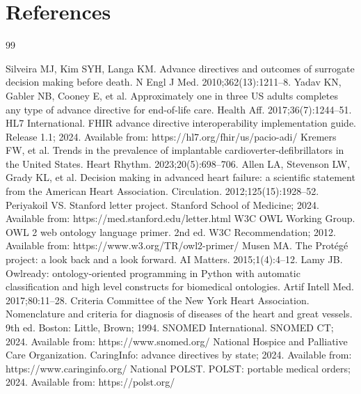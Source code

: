 \documentclass[10pt]{article}
\begin{document}
\section{References}
\begingroup
\renewcommand{\section}[2]{} %
\makeatletter\renewcommand{\@biblabel}[1]{#1.}\makeatother %
\begin{thebibliography}{99}
\small
\setlength{\itemsep}{0pt}
\setlength{\labelsep}{0.4em}

 Silveira MJ, Kim SYH, Langa KM. Advance directives and outcomes of surrogate decision making before death. N Engl J Med. 2010;362(13):1211--8.
 Yadav KN, Gabler NB, Cooney E, et al. Approximately one in three US adults completes any type of advance directive for end-of-life care. Health Aff. 2017;36(7):1244--51.
 HL7 International. FHIR advance directive interoperability implementation guide. Release 1.1; 2024. Available from: https://hl7.org/fhir/us/pacio-adi/
 Kremers FW, et al. Trends in the prevalence of implantable cardioverter-defibrillators in the United States. Heart Rhythm. 2023;20(5):698--706.
 Allen LA, Stevenson LW, Grady KL, et al. Decision making in advanced heart failure: a scientific statement from the American Heart Association. Circulation. 2012;125(15):1928--52.
 Periyakoil VS. Stanford letter project. Stanford School of Medicine; 2024. Available from: https://med.stanford.edu/letter.html
 W3C OWL Working Group. OWL 2 web ontology language primer. 2nd ed. W3C Recommendation; 2012. Available from: https://www.w3.org/TR/owl2-primer/
 Musen MA. The Prot\'eg\'e project: a look back and a look forward. AI Matters. 2015;1(4):4--12.
 Lamy JB. Owlready: ontology-oriented programming in Python with automatic classification and high level constructs for biomedical ontologies. Artif Intell Med. 2017;80:11--28.
 Criteria Committee of the New York Heart Association. Nomenclature and criteria for diagnosis of diseases of the heart and great vessels. 9th ed. Boston: Little, Brown; 1994.
 SNOMED International. SNOMED CT; 2024. Available from: https://www.snomed.org/
 National Hospice and Palliative Care Organization. CaringInfo: advance directives by state; 2024. Available from: https://www.caringinfo.org/
 National POLST. POLST: portable medical orders; 2024. Available from: https://polst.org/

\end{thebibliography}
\endgroup
\end{document}
